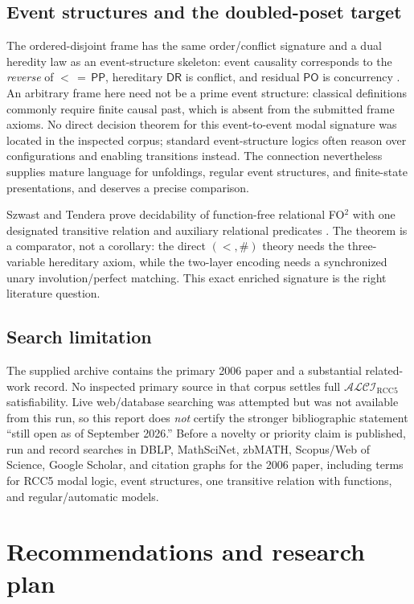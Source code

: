 \documentclass[11pt]{article}
\newcommand{\Logic}{\ensuremath{\mathcal{ALCI}_{\mathrm{RCC5}}}}
\newcommand{\PO}{\ensuremath{\mathsf{PO}}}
\newcommand{\PP}{\ensuremath{\mathsf{PP}}}
\newcommand{\DR}{\ensuremath{\mathsf{DR}}}
\begin{document}
\subsection{Event structures and the doubled-poset target}

The ordered-disjoint frame has the same order/conflict signature and a dual
heredity law as an event-structure skeleton: event causality corresponds to the
\emph{reverse} of \(<\,{=}\,\PP\), hereditary \DR{} is conflict, and residual
\PO{} is concurrency \cite{NielsenPlotkinWinskel1981,Winskel1987}.  An arbitrary
frame here need not be a prime event structure: classical definitions commonly
require finite causal past, which is absent from the submitted frame axioms.
No direct decision theorem for this event-to-event modal
signature was located in the inspected corpus; standard event-structure logics
often reason over configurations and enabling transitions instead.  The
connection nevertheless supplies mature language for unfoldings, regular event
structures, and finite-state presentations, and deserves a precise comparison.

Szwast and Tendera prove decidability of function-free relational FO\(^2\) with
one designated transitive relation and auxiliary relational predicates
\cite{SzwastTendera2013}.  The theorem is a comparator, not a corollary: the
direct \((<,\#)\) theory needs the three-variable hereditary axiom, while the
two-layer encoding needs a synchronized unary involution/perfect matching.
This exact enriched signature is the right literature question.

\subsection{Search limitation}

The supplied archive contains the primary 2006 paper and a substantial related-
work record.  No inspected primary source in that corpus settles full
\Logic{} satisfiability.  Live web/database searching was attempted but was not
available from this run, so this report does \emph{not} certify the stronger
bibliographic statement ``still open as of September 2026.''  Before a novelty
or priority claim is published, run and record searches in DBLP, MathSciNet,
zbMATH, Scopus/Web of Science, Google Scholar, and citation graphs for the 2006
paper, including terms for RCC5 modal logic, event structures, one transitive
relation with functions, and regular/automatic models.

\section{Recommendations and research plan}
\end{document}
